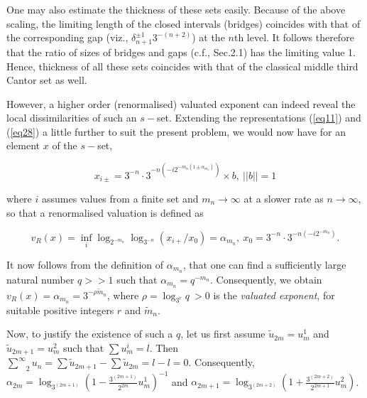 \documentclass[12pt]{article}
\begin{document}
\vspace{.25cm}

One may also estimate the thickness of these sets easily. Because of the above scaling, the limiting length of the closed intervals (bridges) coincides with that of the corresponding  gap (viz., $\delta_{n+1}^{\pm 1}3^{-(n+2)}$) at the $n$th level. It follows therefore that the ratio of sizes of bridges and gaps (c.f., Sec.2.1) has the limiting value 1. Hence, thickness of all these sets coincides with that of the classical middle third Cantor set as well. 

\vspace{.25cm}

However, a higher order (renormalised) valuated exponent can indeed reveal the local dissimilarities of such an $s-$set. Extending the representations (\ref{eq11}) and (\ref{eq28}) a little further to suit the present problem, we would now have for an element $x$ of the $s-$set,

\begin{equation}\label{eq34}
x_{i\pm}= 3^{-n}\cdot 3^{-n(-i2^{-m_n(1\pm \alpha_{m_n})})}\times b, \ ||b||=1
\end{equation} 

\noindent where $i$ assumes values from a finite set and $m_n\rightarrow \infty$ at a slower rate as $n\rightarrow \infty$,  so that a renormalised valuation is defined as

\begin{equation}\label{eq35}
v_R(x)=\underset{i}{\inf}\log_{2^{-m_n}}\log_{3^{-n}} (x_{i+}/x_0) =\alpha_{m_n}, \ x_0= 3^{-n} \cdot 3^{-n(-i2^{-m_n})}. 
\end{equation}

\noindent It now follows from the definition of $\alpha_{m_n}$, that one can  find a sufficiently large natural number $q>>1$ such that $\alpha_{m_n}=q^{-m_n}$. Consequently, we obtain $v_R(x)=\alpha_{m_n}= 3^{-\rho\tilde m_n}$, where $\rho=\log_{3^r} q \ >0$ is the {\em valuated exponent}, for suitable positive integers $r$ and $\tilde m_n$. 

\vspace{.25cm}

Now, to justify the existence of such a $q$, let us first assume $\tilde u_{2m}=u^1_m$ and $\tilde u_{2m+1}= u^2_m$ such that $\sum u^i_m=l$. Then $\underset{2}{\overset {\infty}{\sum}} u_n = \sum \tilde u_{2m+1}-\sum \tilde u_{2m}=l-l=0.$ Consequently, 
$\alpha_{2m}=\log_{3^{(2m+1)}} (1-{\frac{3^{(2m+1)}}{2^{2m}}} u^1_m)^{-1}$ and $\alpha_{2m+1} =\log_{3^{(2m+2)}} (1+{\frac{3^{(2m+2)}}{2^{2m+1}}} u^2_m)$. 
\end{document}
